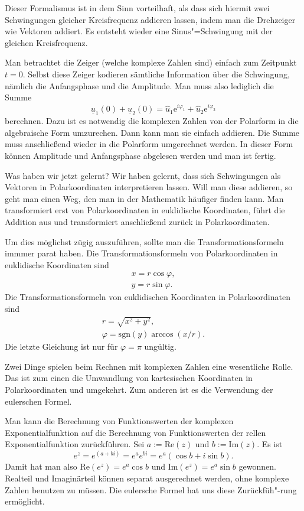 \documentclass[a4paper,10pt,fleqn,twocolumn,twoside]{article}
\begin{document}
Dieser Formalismus ist in dem Sinn vorteilhaft, als dass sich hiermit
zwei Schwingungen gleicher Kreisfrequenz addieren lassen, indem man
die Drehzeiger wie Vektoren addiert. Es entsteht wieder eine
Sinus"=Schwingung mit der gleichen Kreisfrequenz.

Man betrachtet die Zeiger (welche komplexe Zahlen sind) einfach zum
Zeitpunkt \(t=0\). Selbst diese Zeiger kodieren sämtliche Information
über die Schwingung, nämlich die Anfangsphase und die Amplitude. Man
muss also lediglich die Summe
\[\underline{u}_1(0)+\underline{u}_2(0)
= \hat u_1\mathrm{e}^{i\varphi_1}+\hat u_2\mathrm{e}^{i\varphi_2}\]
berechnen. Dazu ist es notwendig die komplexen Zahlen von der
Polarform in die algebraische Form umzurechen.
Dann kann man sie einfach addieren. Die Summe muss anschließend wieder
in die Polarform umgerechnet werden. In dieser Form können Amplitude
und Anfangsphase abgelesen werden und man ist fertig.

Was haben wir jetzt gelernt? Wir haben gelernt, dass sich Schwingungen
als Vektoren in Polarkoordinaten interpretieren lassen. Will man diese
addieren, so geht man einen Weg, den man in der Mathematik häufiger
finden kann. Man transformiert erst von Polarkoordinaten in
euklidische Koordinaten, führt die Addition aus und transformiert
anschließend zurück in Polarkoordinaten.

Um dies möglichst zügig auszuführen, sollte man die
Transformationsformeln immmer parat haben. Die Transformationsformeln
von Polarkoordinaten in euklidische Koordinaten sind
\begin{gather*}
x = r\cos\varphi,\\
y = r\sin\varphi.
\end{gather*}
\noindent
Die Transformationsformeln von euklidischen Koordinaten in
Polarkoordinaten sind
\begin{gather*}
r = \sqrt{x^2+y^2},\\
\varphi = \mathrm{sgn}(y)\arccos(x/r).
\end{gather*}
Die letzte Gleichung ist nur für \(\varphi=\pi\) ungültig.

Zwei Dinge spielen beim Rechnen mit komplexen Zahlen eine
wesentliche Rolle. Das ist zum einen die Umwandlung von kartesischen
Koordinaten in Polarkoordinaten und umgekehrt. Zum anderen ist es
die Verwendung der eulerschen Formel.

Man kann die Berechnung von Funktionswerten der komplexen
Exponentialfunktion auf die Berechnung von Funktionswerten
der rellen Exponentialfunktion zurückführen.
Sei \(a:=\mathrm{Re}(z)\) und \(b:=\mathrm{Im}(z)\). Es ist
\[e^z = e^{(a+bi)} = e^a e^{bi} = e^a(\cos b+i\sin b).\]
Damit hat man also \(\mathrm{Re}(e^z) = e^a\cos b\) und
\(\mathrm{Im}(e^z) = e^a\sin b\) gewonnen. Realteil und Imaginärteil
können separat ausgerechnet werden, ohne komplexe Zahlen benutzen
zu müssen. Die eulersche Formel hat uns diese Zurückfüh"-rung
ermöglicht.
\end{document}
